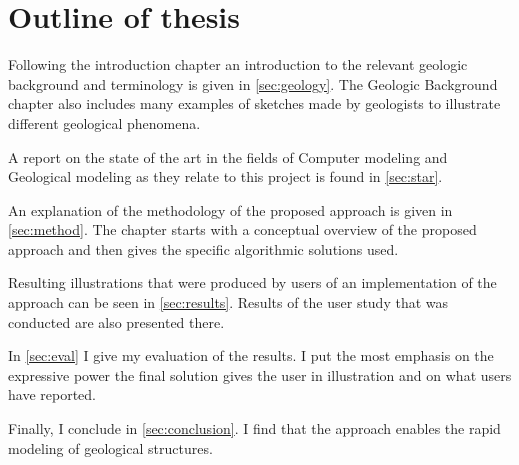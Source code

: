 \documentclass[a4paper,12pt]{report}
\newcommand{\secref}[1]{\autoref{#1}}
\begin{document}
\section{Outline of thesis}

Following the introduction chapter an introduction to the relevant geologic background and terminology is given in \secref{sec:geology}. The Geologic Background chapter also includes many examples of sketches made by geologists to illustrate different geological phenomena.

A report on the state of the art in the fields of Computer modeling and Geological modeling as they relate to this project is found in \secref{sec:star}.

An explanation of the methodology of the proposed approach is given in \secref{sec:method}. The chapter starts with a conceptual overview of the proposed approach and then gives the specific algorithmic solutions used.

Resulting illustrations that were produced by users of an implementation of the approach can be seen in \secref{sec:results}. Results of the user study that was conducted are also presented there.

In \secref{sec:eval} I give my evaluation of the results. I put the most emphasis on the expressive power the final solution gives the user in illustration and on what users have reported.

Finally, I conclude in \secref{sec:conclusion}. I find that the approach enables the rapid modeling of geological structures.




% 
% 	
% 	
	
\end{document}
